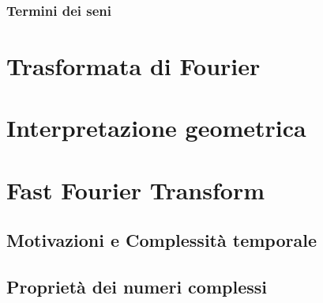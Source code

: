 \subsubsection{Termini dei seni}

\section{Trasformata di Fourier}

\section{Interpretazione geometrica}

\section{Fast Fourier Transform}
\subsection{Motivazioni e Complessit\`a temporale}
\subsection{Propriet\`a dei numeri complessi}


